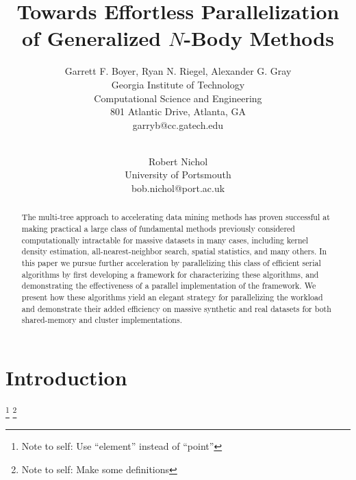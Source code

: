 \documentclass[times, leqno,twocolumn]{article}
\newcommand{\authornote}[1]{\footnote{Note to self: #1}}
\begin{document}
\title{Towards Effortless Parallelization of Generalized $N$-Body Methods}

\author{Garrett F. Boyer, Ryan N. Riegel, Alexander G. Gray
\\ Georgia Institute of Technology
\\ Computational Science and Engineering
\\ 801 Atlantic Drive, Atlanta, GA
\\ garryb@cc.gatech.edu
\\
\and
\\ Robert Nichol
\\ University of Portsmouth
\\ bob.nichol@port.ac.uk
}

\maketitle
\thispagestyle{empty}

\begin{abstract}
The multi-tree approach to accelerating data mining methods has proven successful at making practical a large class of fundamental methods previously considered computationally intractable for massive datasets in many cases, including kernel density estimation, all-nearest-neighbor search, spatial statistics, and many others.
In this paper we pursue further acceleration by parallelizing this class of efficient serial algorithms by first developing a framework for characterizing these algorithms, and demonstrating the effectiveness of a parallel implementation of the framework.
We present how these algorithms yield an elegant strategy for parallelizing the workload and demonstrate their added efficiency on massive synthetic and real datasets for both shared-memory and cluster implementations.
\end{abstract}

\section{Introduction}

\authornote{Use ``element'' instead of ``point''}
\authornote{Make some definitions}
\end{document}
